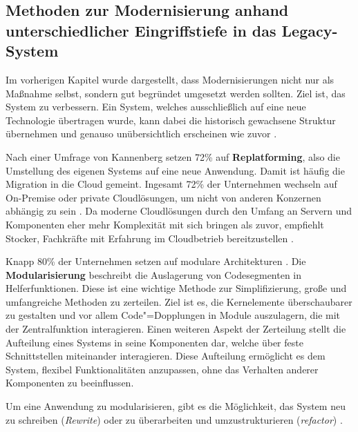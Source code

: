 \subsection{Methoden zur Modernisierung anhand unterschiedlicher Eingriffstiefe in das Legacy-System}
\label{ch:SdF:Legacy:sec:Methoden}

Im vorherigen Kapitel wurde dargestellt, dass Modernisierungen nicht nur als Maßnahme selbst, sondern gut begründet umgesetzt werden sollten. Ziel ist, das System zu verbessern. Ein System, welches ausschließlich auf eine neue Technologie übertragen wurde, kann dabei die historisch gewachsene Struktur übernehmen und genauso unübersichtlich erscheinen wie zuvor \cite{FlorianStocker:2024}.

Nach einer Umfrage von Kannenberg setzen 72\% auf \textbf{Replatforming}, also die Umstellung des eigenen Systems auf eine neue Anwendung. Damit ist häufig die Migration in die Cloud gemeint.
Ingesamt 72\% der Unternehmen wechseln auf On-Premise oder private Cloudlösungen, um nicht von anderen Konzernen abhängig zu sein \cite{AxelKannenberg:2025}.
Da moderne Cloudlösungen durch den Umfang an Servern und Komponenten eher mehr Komplexität mit sich bringen als zuvor, empfiehlt Stocker, Fachkräfte mit Erfahrung im Cloudbetrieb bereitzustellen \cite{FlorianStocker:2024}. 

Knapp 80\% der Unternehmen setzen auf modulare Architekturen \cite{AxelKannenberg:2025}. Die \textbf{Modularisierung} beschreibt die Auslagerung von Codesegmenten in Helferfunktionen. Diese ist eine wichtige Methode zur Simplifizierung, große und umfangreiche Methoden zu zerteilen. Ziel ist es, die Kernelemente überschaubarer zu gestalten und vor allem Code"=Dopplungen in Module auszulagern, die mit der Zentralfunktion interagieren. Einen weiteren Aspekt der Zerteilung stellt die Aufteilung eines Systems in seine Komponenten dar, welche über feste Schnittstellen miteinander interagieren.
Diese Aufteilung ermöglicht es dem System, flexibel Funktionalitäten anzupassen, ohne das Verhalten anderer Komponenten zu beeinflussen.
\cites{AxelKannenberg:2025}{ElMorabea:2021}[S. 19]{Stantchev:2010}

Um eine Anwendung zu modularisieren, gibt es die Möglichkeit, das System neu zu schreiben (\textit{Rewrite}) oder zu überarbeiten und umzustrukturieren (\textit{refactor}) \cite[S. 127]{ElMorabea:2021}.

